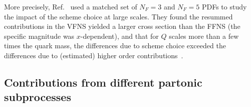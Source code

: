 \documentclass[pdftex,twocolumn,epjc3]{svjour3}          %
\begin{document}
More precisely, Ref.~\cite{Kusina:2013slm} used a matched set of $N_F=3$ and $N_F=5$ PDFs
to study the impact of the scheme choice at large scales. They found the resummed contributions 
in the VFNS yielded a larger cross section than the FFNS (the specific magnitude was $x$-dependent), and that for $Q$ scales more than a few times the quark mass, the differences due to scheme choice
exceeded the differences due to (estimated) higher order contributions~\cite{Kusina:2013slm}. 


\color{black} %



\subsection{Contributions from different partonic subprocesses}
\label{sec:thpred-partonic}
\end{document}
